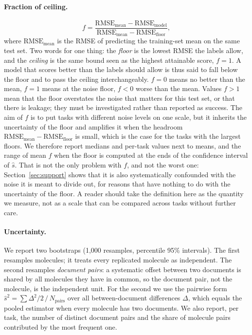 \paragraph{Fraction of ceiling.}
\begin{equation}
f=\frac{\mathrm{RMSE}_{\text{mean}}-\mathrm{RMSE}_{\text{model}}}{\mathrm{RMSE}_{\text{mean}}-\mathrm{RMSE}_{\mathrm{floor}}},
\end{equation}
where $\mathrm{RMSE}_{\text{mean}}$ is the RMSE of predicting the training-set mean on the same test set. Two words for one thing: the \emph{floor} is the lowest RMSE the labels allow, and the \emph{ceiling} is the same bound seen as the highest attainable score, $f=1$. A model that scores better than the labels should allow is thus said to fall below the floor and to pass the ceiling interchangeably. $f=0$ means no better than the mean, $f=1$ means at the noise floor, $f<0$ worse than the mean. Values $f>1$ mean that the floor overstates the noise that matters for this test set, or that there is leakage; they must be investigated rather than reported as success. The aim of $f$ is to put tasks with different noise levels on one scale, but it inherits the uncertainty of the floor and amplifies it when the headroom $\mathrm{RMSE}_{\text{mean}}-\mathrm{RMSE}_{\mathrm{floor}}$ is small, which is the case for the tasks with the largest floors. We therefore report medians and per-task values next to means, and the range of mean $f$ when the floor is computed at the ends of the confidence interval of $\hat s$. That is not the only problem with $f$, and not the worst one: Section~\ref{sec:support} shows that it is also systematically confounded with the noise it is meant to divide out, for reasons that have nothing to do with the uncertainty of the floor. A reader should take the definition here as the quantity we measure, not as a scale that can be compared across tasks without further care.

\paragraph{Uncertainty.}
We report two bootstraps (1{,}000 resamples, percentile 95\% intervals). The first resamples molecules; it treats every replicated molecule as independent. The second resamples \emph{document pairs}: a systematic offset between two documents is shared by all molecules they have in common, so the document pair, not the molecule, is the independent unit. For the second we use the pairwise form $\hat s^2=\sum \Delta^2/2 \,/\, N_{\text{pairs}}$ over all between-document differences $\Delta$, which equals the pooled estimator when every molecule has two documents. We also report, per task, the number of distinct document pairs and the share of molecule pairs contributed by the most frequent one.

